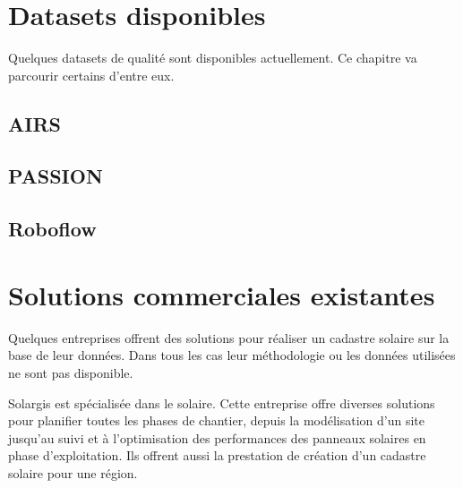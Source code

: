 {{{%
\section{Datasets disponibles}

\par{Quelques datasets de qualité sont disponibles actuellement. Ce chapitre va parcourir certains d'entre eux.}

\subsection{AIRS}

\subsection{PASSION}

\subsection{Roboflow}

\section{Solutions commerciales existantes}

\par{Quelques entreprises offrent des solutions pour réaliser un cadastre solaire sur la base de leur données. Dans tous les cas leur méthodologie ou les données utilisées ne sont pas disponible.}

\par{Solargis \cite{solargis_regional_nodate} est spécialisée dans le solaire. Cette entreprise offre diverses solutions pour planifier toutes les phases de chantier, depuis la modélisation d'un site jusqu'au suivi et à l'optimisation des performances des panneaux solaires en phase d'exploitation. Ils offrent aussi la prestation de création d'un cadastre solaire pour une région.}

}}}
